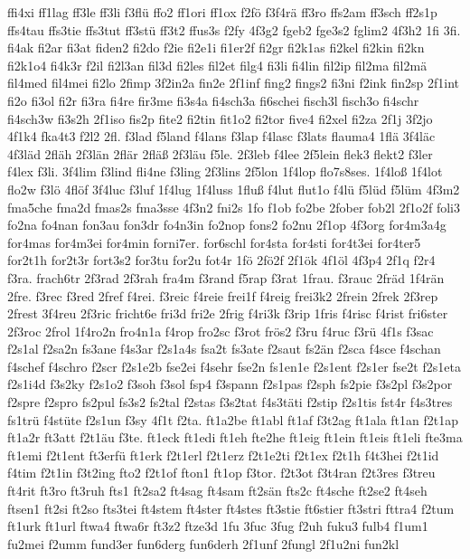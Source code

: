 {ffi4xi
ff1lag
ff3le
ff3li
f3flü
ffo2
ff1ori
ff1ox
f2fö
f3f4rä
ff3ro
ffs2am
ff3sch
ff2s1p
ffs4tau
ffs3tie
ffs3tut
ff3stü
ff3t2
ffus3s
f2fy
4f3g2
fgeb2
fge3s2
fglim2
4f3h2
1fi
3fi.
fi4ak
fi2ar
fi3at
fiden2
fi2do
f2ie
fi2e1i
fi1er2f
fi2gr
fi2k1as
fi2kel
fi2kin
fi2kn
fi2k1o4
fi4k3r
f2il
fi2l3an
fil3d
fi2les
fil2et
filg4
fi3li
fi4lin
fil2ip
fil2ma
fil2mä
fil4med
fil4mei
fi2lo
2fimp
3f2in2a
fin2e
2f1inf
fing2
fings2
fi3ni
f2ink
fin2sp
2f1int
fi2o
fi3ol
fi2r
fi3ra
fi4re
fir3me
fi3s4a
fi4sch3a
fi6schei
fisch3l
fisch3o
fi4schr
fi4sch3w
fi3s2h
2f1iso
fis2p
fite2
fi2tin
fit1o2
fi2tor
five4
fi2xel
fi2za
2f1j
3f2jo
4f1k4
fka4t3
f2l2
2fl.
f3lad
f5land
f4lans
f3lap
f4lasc
f3lats
flauma4
1flä
3f4läc
4f3läd
2fläh
2f3län
2flär
2fläß
2f3läu
f5le.
2f3leb
f4lee
2f5lein
flek3
flekt2
f3ler
f4lex
f3li.
3f4lim
f3lind
fli4ne
f3ling
2f3lins
2f5lon
1f4lop
flo7s8ses.
1f4loß
1f4lot
flo2w
f3lö
4flöf
3f4luc
f3luf
1f4lug
1f4luss
1fluß
f4lut
flut1o
f4lü
f5lüd
f5lüm
4f3m2
fma5che
fma2d
fmas2s
fma3sse
4f3n2
fni2s
1fo
f1ob
fo2be
2fober
fob2l
2f1o2f
foli3
fo2na
fo4nan
fon3au
fon3dr
fo4n3in
fo2nop
fons2
fo2nu
2f1op
4f3org
for4m3a4g
for4mas
for4m3ei
for4min
forni7er.
for6schl
for4sta
for4sti
for4t3ei
for4ter5
for2t1h
for2t3r
fort3s2
for3tu
for2u
fot4r
1fö
2fö2f
2f1ök
4f1öl
4f3p4
2f1q
f2r4
f3ra.
frach6tr
2f3rad
2f3rah
fra4m
f3rand
f5rap
f3rat
1frau.
f3rauc
2fräd
1f4rän
2fre.
f3rec
f3red
2fref
f4rei.
f3reic
f4reie
frei1f
f4reig
frei3k2
2frein
2frek
2f3rep
2frest
3f4reu
2f3ric
fricht6e
fri3d
fri2e
2frig
f4ri3k
f3rip
1fris
f4risc
f4rist
fri6ster
2f3roc
2frol
1f4ro2n
fro4n1a
f4rop
fro2sc
f3rot
frös2
f3ru
f4ruc
f3rü
4f1s
f3sac
f2s1al
f2sa2n
fs3ane
f4s3ar
f2s1a4s
fsa2t
fs3ate
f2saut
fs2än
f2sca
f4sce
f4schan
f4schef
f4schro
f2scr
f2s1e2b
fse2ei
f4sehr
fse2n
fs1en1e
f2s1ent
f2s1er
fse2t
f2s1eta
f2s1i4d
f3s2ky
f2s1o2
f3soh
f3sol
fsp4
f3spann
f2s1pas
f2sph
fs2pie
f3s2pl
f3s2por
f2spre
f2spro
fs2pul
fs3s2
fs2tal
f2stas
f3s2tat
f4s3täti
f2stip
f2s1tis
fst4r
f4s3tres
fs1trü
f4stüte
f2s1un
f3sy
4f1t
f2ta.
ft1a2be
ft1abl
ft1af
f3t2ag
ft1ala
ft1an
f2t1ap
ft1a2r
ft3att
f2t1äu
f3te.
ft1eck
ft1edi
ft1eh
fte2he
ft1eig
ft1ein
ft1eis
ft1eli
fte3ma
ft1emi
f2t1ent
ft3erfü
ft1erk
f2t1erl
f2t1erz
f2t1e2ti
f2t1ex
f2t1h
f4t3hei
f2t1id
f4tim
f2t1in
f3t2ing
fto2
f2t1of
fton1
ft1op
f3tor.
f2t3ot
f3t4ran
f2t3res
f3treu
ft4rit
ft3ro
ft3ruh
fts1
ft2sa2
ft4sag
ft4sam
ft2sän
fts2c
ft4sche
ft2se2
ft4seh
ftsen1
ft2si
ft2so
fts3tei
ft4stem
ft4ster
ft4stes
ft3stie
ft6stier
ft3stri
fttra4
f2tum
ft1urk
ft1url
ftwa4
ftwa6r
ft3z2
ftze3d
1fu
3fuc
3fug
f2uh
fuku3
fulb4
f1um1
fu2mei
f2umm
fund3er
fun6derg
fun6derh
2f1unf
2fungl
2f1u2ni
fun2kl
}
